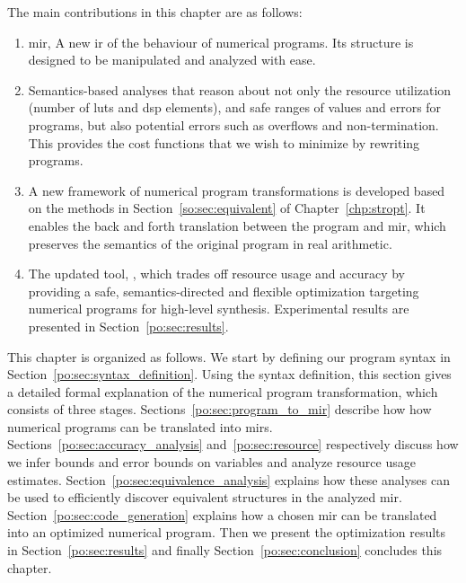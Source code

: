 The main contributions in this chapter are as follows:
\begin{enumerate}

    \item \Acrfull{mir}, A new \gls{ir} of the behaviour of numerical programs.
    Its structure is designed to be manipulated and analyzed with ease.

    \item Semantics-based analyses that reason about not only the resource
    utilization (number of \glspl{lut} and \gls{dsp} elements), and safe ranges
    of values and errors for programs, but also potential errors such as
    overflows and non-termination.  This provides the cost functions that we
    wish to minimize by rewriting programs.

    \item A new framework of numerical program transformations is
    developed based on the methods in Section~\ref{so:sec:equivalent} of
    Chapter~\ref{chp:stropt}.  It enables the back and forth translation
    between the program and \gls{mir}, which preserves the semantics of the
    original program in real arithmetic.

    \item The updated tool, \soap, which trades off resource usage and accuracy
    by providing a safe, semantics-directed and flexible optimization targeting
    numerical programs for high-level synthesis.  Experimental results are
    presented in Section~\ref{po:sec:results}.

\end{enumerate}

This chapter is organized as follows.  We start by defining our program
syntax in Section~\ref{po:sec:syntax_definition}.  Using the syntax
definition, this section gives a detailed formal explanation of the
numerical program transformation, which consists of three stages.
Sections~\ref{po:sec:program_to_mir} describe how how numerical programs can
be translated into \glspl{mir}.  Sections~\ref{po:sec:accuracy_analysis}
and~\ref{po:sec:resource} respectively discuss how we infer bounds
and error bounds on variables and analyze resource usage estimates.
Section~\ref{po:sec:equivalence_analysis} explains how these analyses can
be used to efficiently discover equivalent structures in the analyzed
\gls{mir}\@.  Section~\ref{po:sec:code_generation} explains how a chosen
\gls{mir} can be translated into an optimized numerical program.  Then we
present the optimization results in Section~\ref{po:sec:results} and finally
Section~\ref{po:sec:conclusion} concludes this chapter.
